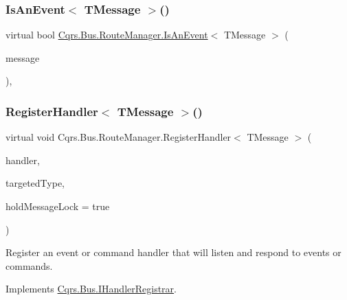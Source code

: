 \subsubsection{\texorpdfstring{Is\+An\+Event$<$ T\+Message $>$()}{IsAnEvent< TMessage >()}}
{\footnotesize\ttfamily virtual bool \hyperlink{classCqrs_1_1Bus_1_1RouteManager_a7b9b2ad8b9f5d7761b0f45c033b96101}{Cqrs.\+Bus.\+Route\+Manager.\+Is\+An\+Event}$<$ T\+Message $>$ (\begin{DoxyParamCaption}\item[{T\+Message}]{message }\end{DoxyParamCaption})\hspace{0.3cm}{\ttfamily [protected]}, {\ttfamily [virtual]}}

\mbox{\label{classCqrs_1_1Bus_1_1RouteManager_a5a01e8a6c9ae6311bca2d9e5cb75a7b9}} 
\subsubsection{\texorpdfstring{Register\+Handler$<$ T\+Message $>$()}{RegisterHandler< TMessage >()}\hspace{0.1cm}{\footnotesize\ttfamily [1/2]}}
{\footnotesize\ttfamily virtual void Cqrs.\+Bus.\+Route\+Manager.\+Register\+Handler$<$ T\+Message $>$ (\begin{DoxyParamCaption}\item[{Action$<$ T\+Message $>$}]{handler,  }\item[{Type}]{targeted\+Type,  }\item[{bool}]{hold\+Message\+Lock = {\ttfamily true} }\end{DoxyParamCaption})\hspace{0.3cm}{\ttfamily [virtual]}}



Register an event or command handler that will listen and respond to events or commands. 



Implements \hyperlink{interfaceCqrs_1_1Bus_1_1IHandlerRegistrar_ab6ca4dfdc54a5aeebe4651dbdb479f55}{Cqrs.\+Bus.\+I\+Handler\+Registrar}.

